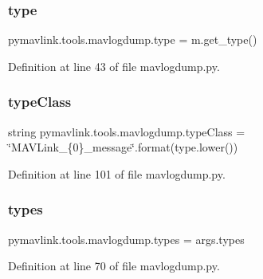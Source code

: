 \subsubsection{\texorpdfstring{type}{type}}
{\footnotesize\ttfamily pymavlink.\+tools.\+mavlogdump.\+type = m.\+get\+\_\+type()}



Definition at line 43 of file mavlogdump.\+py.

\mbox{\label{namespacepymavlink_1_1tools_1_1mavlogdump_ac7f442d05e751559a14b0ca409556f09}} 
\subsubsection{\texorpdfstring{typeClass}{typeClass}}
{\footnotesize\ttfamily string pymavlink.\+tools.\+mavlogdump.\+type\+Class = \char`\"{}M\+A\+V\+Link\+\_\+\{0\}\+\_\+message\char`\"{}.format(type.\+lower())}



Definition at line 101 of file mavlogdump.\+py.

\mbox{\label{namespacepymavlink_1_1tools_1_1mavlogdump_a4adf6ef58d78f7724af78687dbb88a27}} 
\subsubsection{\texorpdfstring{types}{types}}
{\footnotesize\ttfamily pymavlink.\+tools.\+mavlogdump.\+types = args.\+types}



Definition at line 70 of file mavlogdump.\+py.

